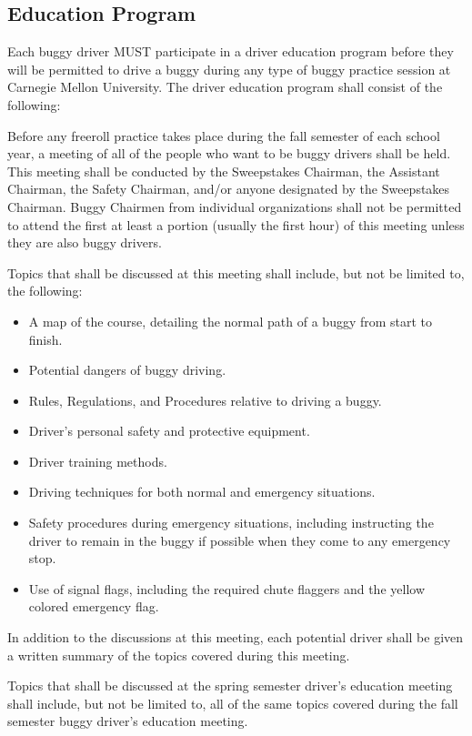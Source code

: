 \subsection{Education Program}

	Each buggy driver MUST participate in a driver education program before they will be permitted to drive a buggy during any type of buggy practice session at Carnegie Mellon University. The driver education program shall consist of the following:

	Before any freeroll practice takes place during the fall semester of each school year, a meeting of all of the people who want to be buggy drivers shall be held. This meeting shall be conducted by the Sweepstakes Chairman, the Assistant Chairman, the Safety Chairman, and/or anyone designated by the Sweepstakes Chairman. Buggy Chairmen from individual organizations shall not be permitted to attend the first at least a portion (usually the first hour) of this meeting unless they are also buggy drivers.

	Topics that shall be discussed at this meeting shall include, but not be limited to, the following:

	\begin{itemize}
		\item A map of the course, detailing the normal path of a buggy from start to finish.
		\item Potential dangers of buggy driving.
		\item Rules, Regulations, and Procedures relative to driving a buggy.
		\item Driver's personal safety and protective equipment.
		\item Driver training methods.
		\item Driving techniques for both normal and emergency situations.
		\item Safety procedures during emergency situations, including instructing the driver to remain in the buggy if possible when they come to any emergency stop.
		\item Use of signal flags, including the required chute flaggers and the yellow colored emergency flag.
	\end{itemize}

	In addition to the discussions at this meeting, each potential driver shall be given a written summary of the topics covered during this meeting. 
	
	Topics that shall be discussed at the spring semester driver's education meeting shall include, but not be limited to, all of the same topics covered during the fall semester buggy driver's education meeting.
	

